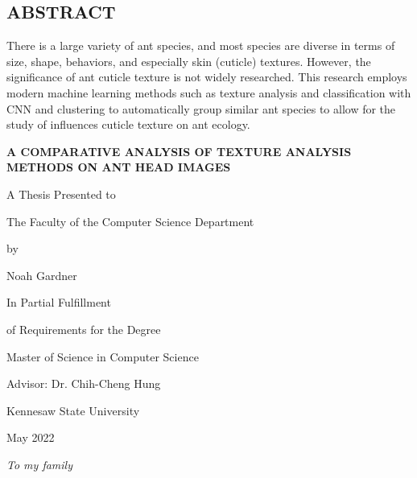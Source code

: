 \documentclass[12pt]{article}
\newcommand{\thesistitle}{
    {\Large A comparative analysis of texture analysis methods on
ant head images}
}
\begin{document}
\begin{center}
    \section*{ABSTRACT}
\end{center}
\vspace{0.5in}

\noindent There is a large variety of ant species, and most species are diverse
in terms of size, shape, behaviors, and especially skin (cuticle) textures.
However, the significance of ant cuticle texture is not widely researched. This
research employs modern machine learning methods such as texture analysis and
classification with CNN and clustering to automatically group similar ant
species to allow for the study of influences cuticle texture on ant ecology.
\newpage

\begin{center}
    \textbf{\MakeUppercase{\thesistitle}}
    \vspace{1in}

    A Thesis Presented to

    The Faculty of the Computer Science Department
    \vspace{1in}

    by
    \vspace{0.5in}

    Noah Gardner
    \vspace{1in}

    In Partial Fulfillment

    of Requirements for the Degree

    Master of Science in Computer Science
    \vspace{0.5in}

    Advisor: Dr. Chih-Cheng Hung
    \vspace{0.5in}

    Kennesaw State University

    May 2022
\end{center}
\newpage

\vspace*{\fill}
\begin{center}
    \textit{To my family}
\end{center}
\vspace*{\fill}
\newpage
\end{document}
